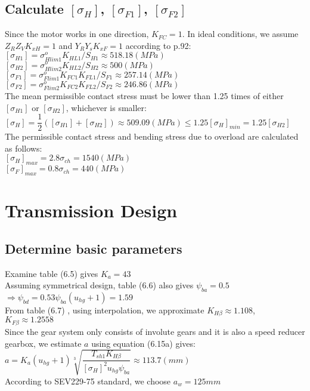 \subsection{Calculate $ [{\sigma}_H] $, $ [{\sigma}_{F1}] $, $ [{\sigma}_{F2}] $}
Since the motor works in one direction, $ K_{FC} = 1$. In ideal conditions, we assume $ Z_RZ_VK_{xH} = 1 $ and $ Y_RY_sK_{xF} = 1 $ according to p.92:\\
$ [{\sigma}_{H1}] = \sigma_{Hlim1}^oK_{HL1}/S_{H1} \approx 518.18 \unit{(MPa)}$\\
$ [{\sigma}_{H2}] = \sigma_{Hlim2}^oK_{HL2}/S_{H2} \approx 500 \unit{(MPa)}$\\
$ [{\sigma}_{F1}] = \sigma_{Flim1}^oK_{FC1}K_{FL1}/S_{F1} \approx 257.14\unit{(MPa)}$\\
$ [{\sigma}_{F2}] = \sigma_{Flim2}^oK_{FC2}K_{FL2}/S_{F2} \approx 246.86 \unit{(MPa)}$\\
The mean permissible contact stress must be lower than 1.25 times of either $ [{\sigma}_{H1}] $ or $ [{\sigma}_{H2}] $, whichever is smaller:\\
$ [{\sigma}_H] = \dfrac{1}{2}\left( [{\sigma}_{H1}]+[{\sigma}_{H2}]\right)  \approx 509.09 \unit{(MPa)}\leq 1.25[{\sigma}_H]_{min} = 1.25[{\sigma}_{H2}]$\\
The permissible contact stress and bending stress due to overload are calculated as follows:\\
$ [{\sigma}_H]_{max} = 2.8\sigma_{ch} = 1540\unit{(MPa)} $\\
$ [{\sigma}_F]_{max} = 0.8\sigma_{ch} = 440\unit{(MPa)} $

\section{Transmission Design}

\subsection{Determine basic parameters}
Examine table (6.5)  gives $ K_a = 43 $\\
Assuming symmetrical design, table (6.6)  also gives $ \psi_{ba} = 0.5$\\
$ \Rightarrow \psi_{bd} = 0.53\psi_{ba}(u_{hg}+1) = 1.59$\\
From table (6.7) , using interpolation, we approximate $ K_{H\beta} \approx 1.108 $, $ K_{F\beta} \approx 1.2558 $\\
Since the gear system only consists of involute gears and it is also a speed reducer gearbox, we estimate $ a $ using equation (6.15a) gives:\\
$ a = K_a(u_{hg}+1)\sqrt[3]{\dfrac{T_{sh1}K_{H\beta}}{[{\sigma}_H]^2u_{hg}\psi_{ba}}} \approx 113.7 \unit{(mm)}$\\
According to SEV229-75 standard, we choose $ a_w = 125 \unit{mm}$

